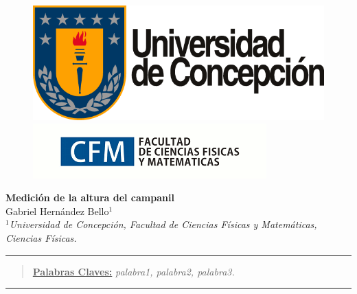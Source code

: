 \documentclass[10pt,a4paper]{article}
\author{Gabriel Hernandez Bello}
\begin{document}
	
	\begin{figure}[H]
		\raggedright
		\includegraphics[scale=0.2]{IMG/logo_udec.png} \hfill \includegraphics[scale=0.5]{IMG/cfm_logo.png}
	\end{figure}

	\vspace{6mm}
	\begin{center}
		{\Large \textbf{Medición de la altura del campanil}}\\
		\vspace{2mm}
		{\large Gabriel Hernández Bello$^{1}$}\\
		\vspace{6.5mm}
		$^1$\textit{Universidad de Concepción, Facultad de Ciencias Físicas y Matemáticas, Ciencias Físicas. }\\
	\end{center}

	\begin{center}
		\textcolor{azul}{\rule{150mm}{0.8mm}}
	\end{center}

	\begin{abstract}
		\underline{\textbf{Palabras Claves:}} \hspace{2mm} \textit{palabra1, palabra2, palabra3.}
	\end{abstract}
	
	\begin{center}
		\textcolor{azul}{\rule{150mm}{0.8mm}}
	\end{center}
	
\end{document}
